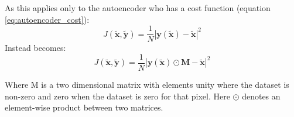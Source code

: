       As this applies only to the autoencoder who has a cost function (equation \ref{eq:autoencoder_cost}):
      \begin{equation}
          J(\tilde{\mathbf{x}},\tilde{\mathbf{y}})
          = \frac{1}{N}\left |\mathbf{y}(\tilde{\mathbf{x}})-\tilde{\mathbf{x}}\right | ^2
      \end{equation}
      Instead becomes:
      \begin{equation}
          J(\tilde{\mathbf{x}},\tilde{\mathbf{y}})
          = \frac{1}{N}\left |\mathbf{y}(\tilde{\mathbf{x}}) \odot \mathbf{M}-\tilde{\mathbf{x}}\right | ^2
      \end{equation}

      Where M is a two dimensional matrix with elements unity where the dataset is non-zero
      and zero when the dataset is zero for that pixel. Here $\odot$ denotes an element-wise
      product between two matrices.
